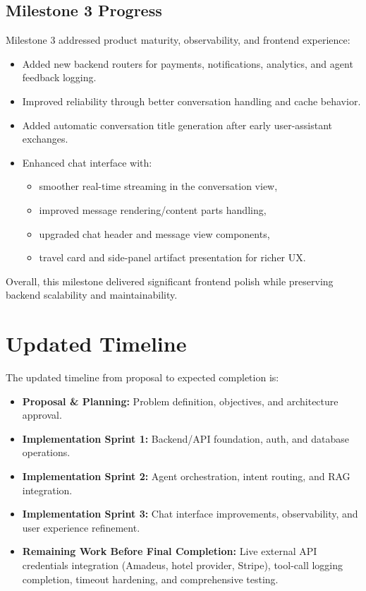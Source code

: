 \documentclass[12pt]{article}
\begin{document}
\subsection{Milestone 3 Progress}
Milestone 3 addressed product maturity, observability, and frontend experience:
\begin{itemize}
    \item Added new backend routers for payments, notifications, analytics, and agent feedback logging.
    \item Improved reliability through better conversation handling and cache behavior.
    \item Added automatic conversation title generation after early user-assistant exchanges.
    \item Enhanced chat interface with:
    \begin{itemize}
        \item smoother real-time streaming in the conversation view,
        \item improved message rendering/content parts handling,
        \item upgraded chat header and message view components,
        \item travel card and side-panel artifact presentation for richer UX.
    \end{itemize}
\end{itemize}

Overall, this milestone delivered significant frontend polish while preserving backend scalability and maintainability.

\section{Updated Timeline}
The updated timeline from proposal to expected completion is:
\begin{itemize}
    \item \textbf{Proposal \& Planning:} Problem definition, objectives, and architecture approval.
    \item \textbf{Implementation Sprint 1:} Backend/API foundation, auth, and database operations.
    \item \textbf{Implementation Sprint 2:} Agent orchestration, intent routing, and RAG integration.
    \item \textbf{Implementation Sprint 3:} Chat interface improvements, observability, and user experience refinement.
    \item \textbf{Remaining Work Before Final Completion:} Live external API credentials integration (Amadeus, hotel provider, Stripe), tool-call logging completion, timeout hardening, and comprehensive testing.
\end{itemize}
\end{document}
